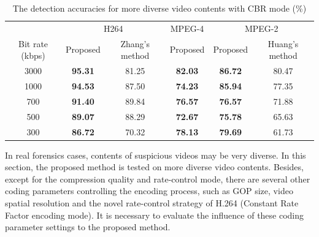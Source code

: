 \documentclass[journal,sort]{IEEEtran}
\begin{document}
\begin{table}[!htb]
	\centering
	\caption{The detection accuracies for more diverse video contents with CBR mode (\%)}
	\begin{tabular}{cccccc}
		\toprule
		& \multicolumn{2}{c}{H264} & MPEG-4 & \multicolumn{2}{c}{MPEG-2} \\
		\cmidrule(r){2-3}\cmidrule(r){4-4}\cmidrule(r){5-6}
		\multicolumn{1}{c}{Bit rate (kbps)} & Proposed & Zhang's method & Proposed & Proposed & Huang's method \\
		\midrule
		3000  & \textbf{95.31} & 81.25 & \textbf{82.03} & \textbf{86.72} & 80.47 \\
		1000  & \textbf{94.53} & 87.50 & \textbf{74.23} & \textbf{85.94} & 77.35 \\
		700   & \textbf{91.40} & 89.84 & \textbf{76.57} & \textbf{76.57} & 71.88 \\
		500   & \textbf{89.07} & 88.29 & \textbf{72.67} & \textbf{75.78} & 65.63 \\
		300   & \textbf{86.72} & 70.32 & \textbf{78.13} & \textbf{79.69} & 61.73 \\
		\bottomrule
	\end{tabular}%
	\label{tab:part2-cbr}%
\end{table}


In real forensics cases, contents of suspicious videos may be very diverse. In this section, the proposed method is tested on more diverse video contents. Besides, except for the compression quality and rate-control mode, there are several other coding parameters controlling the encoding process, such as GOP size, video spatial resolution and the novel rate-control strategy of H.264 (Constant Rate Factor encoding mode). It is necessary to evaluate the influence of these coding parameter settings to the proposed method. 
\end{document}
